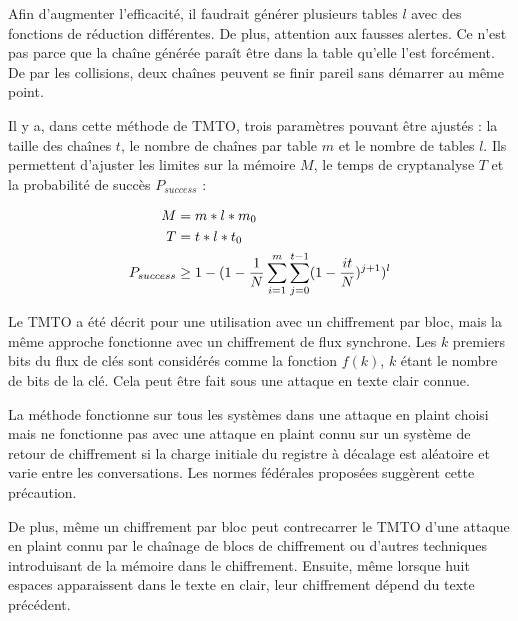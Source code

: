 		Afin d'augmenter l'efficacité, il faudrait générer plusieurs tables $l$ avec des fonctions de réduction différentes. De plus, attention aux fausses alertes. Ce n'est pas parce que la chaîne générée paraît être dans la table qu'elle l'est forcément. De par les collisions, deux chaînes peuvent se finir pareil sans démarrer au même point.


		Il y a, dans cette méthode de \gls{TMTO}, trois paramètres pouvant être ajustés : la taille des chaînes $t$, le nombre de chaînes par table $m$ et le nombre de tables $l$. Ils permettent d'ajuster les limites sur la mémoire $M$, le temps de cryptanalyse $T$ et la probabilité de succès $P_{success}$\cite{Oech03} :

		\bigskip

		\begin{align*}
			M &= m*l*m_0\\
			T &= t*l*t_0\\
			P_{success} &\ge{} 1 - (1 - \frac{1}{N} \sum\limits_{i=1}^{m}\sum\limits_{j=0}^{t-1} (1 - \frac{it}{N})^{j+1})^l
		\end{align*}

		\bigskip

		Le \gls{TMTO} a été décrit pour une utilisation avec un chiffrement par bloc\cite{ehellman}, mais la même approche fonctionne avec un chiffrement de flux synchrone\cite{ehellman}. Les $k$ premiers bits du flux de clés sont considérés comme la fonction $f(k)$, $k$ étant le nombre de bits de la clé. Cela peut être fait sous une attaque en texte clair connue.

		\bigskip

		La méthode fonctionne sur tous les systèmes dans une attaque en \gls{plaint} choisi mais ne fonctionne pas avec une attaque en \gls{plaint} connu sur un système de retour de chiffrement si la charge initiale du registre à décalage est aléatoire et varie entre les conversations. Les normes fédérales proposées\cite{ehellman} suggèrent cette précaution.

		\bigskip

		De plus, même un chiffrement par bloc peut contrecarrer le \gls{TMTO} d'une attaque en \gls{plaint} connu par le chaînage de blocs de chiffrement ou d'autres techniques introduisant de la mémoire dans le chiffrement. Ensuite, même lorsque huit espaces apparaissent dans le texte en clair, leur chiffrement dépend du texte précédent.

		\bigskip

